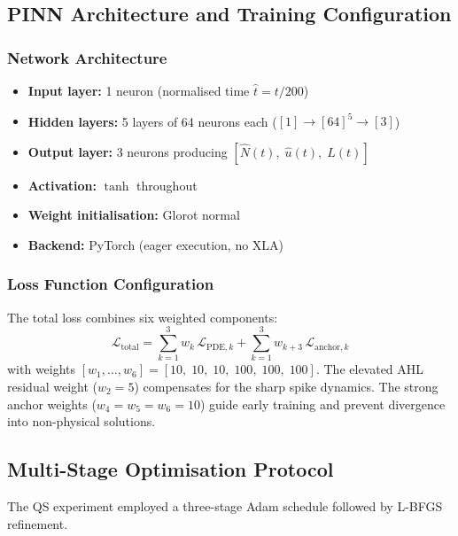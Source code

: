 \documentclass[14pt,a4paper,openany]{extbook}
\begin{document}
\subsection{PINN Architecture and Training Configuration}
\label{subsec:qs_training_forward}

\subsubsection{Network Architecture}

\begin{itemize}
    \item \textbf{Input layer:} 1 neuron (normalised time $\hat{t} = t/200$)
    \item \textbf{Hidden layers:} 5 layers of 64 neurons each
          ($[1] \to [64]^5 \to [3]$)
    \item \textbf{Output layer:} 3 neurons producing
          $[\hat{N}(t),\;\hat{u}(t),\;\hat{L}(t)]$
    \item \textbf{Activation:} $\tanh$ throughout
    \item \textbf{Weight initialisation:} Glorot normal
    \item \textbf{Backend:} PyTorch (eager execution, no XLA)
\end{itemize}

\subsubsection{Loss Function Configuration}

The total loss combines six weighted components:
\begin{equation}
\mathcal{L}_{\mathrm{total}}
    = \sum_{k=1}^{3} w_k\,\mathcal{L}_{\mathrm{PDE},k}
    + \sum_{k=1}^{3} w_{k+3}\,\mathcal{L}_{\mathrm{anchor},k}
\label{eq:qs_loss}
\end{equation}
with weights $[w_1,\ldots,w_6] = [10,\; 10,\; 10,\; 100,\; 100,\; 100]$.
The elevated AHL residual weight ($w_2 = 5$) compensates for the sharp spike dynamics.
The strong anchor weights ($w_4 = w_5 = w_6 = 10$) guide early training and prevent
divergence into non-physical solutions.

\subsection{Multi-Stage Optimisation Protocol}

The QS experiment employed a three-stage Adam schedule followed by L-BFGS refinement.
\end{document}
